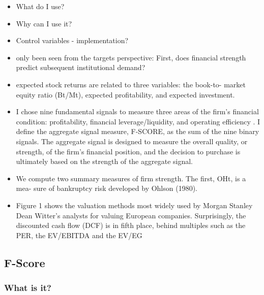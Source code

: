 \documentclass[12pt]{article}
\begin{document}
    \begin{itemize}
        \item What do I use? 
        \item Why can I use it?
        \item Control variables - implementation?

        \item only been seen from the targets perspective: First, does financial strength predict subsequent institutional demand? \citep{Choi2012}

        \item expected stock returns are related to three variables: the book-to-
        market equity ratio (Bt/Mt), expected profitability, and expected investment.\citep{Fama2006}
        
        \item I chose nine fundamental signals to measure three areas of the firm's financial condition: profitability, financial leverage/liquidity, and operating efficiency \citep{Piotroski2000}. I define the aggregate signal measure, F-SCORE, as the sum of the nine binary signals. The aggregate signal is designed to measure the overall quality, or strength, of the firm's financial position, and the decision to purchase is ultimately based on the strength of the aggregate signal.

        \item We compute two summary measures of firm strength. The first, OHt, is a mea- sure of bankruptcy risk developed by Ohlson (1980).\citep{Fama2006}

        \item Figure 1 shows the valuation methods most widely used by Morgan Stanley Dean Witter’s analysts for valuing European companies. Surprisingly, the discounted cash flow (DCF) is in fifth place, behind multiples such as the PER, the EV/EBITDA and the EV/EG \citep{Fernandez2001}

    \end{itemize}

\subsection{F-Score}

    \subsubsection{What is it?}
\end{document}
